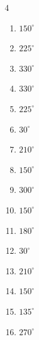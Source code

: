 \begin{multicols}{4}
\begin{enumerate}
  \item $\displaystyle 150^{\circ}$

  \item $\displaystyle 225^{\circ}$

  \item $\displaystyle 330^{\circ}$

  \item $\displaystyle 330^{\circ}$

  \item $\displaystyle 225^{\circ}$

  \item $\displaystyle 30^{\circ}$

  \item $\displaystyle 210^{\circ}$

  \item $\displaystyle 150^{\circ}$

\columnbreak %

  \item $\displaystyle 300^{\circ}$

  \item $\displaystyle 150^{\circ}$

  \item $\displaystyle 180^{\circ}$
        \phantom{$\displaystyle =\pi$}

  \item $\displaystyle 30^{\circ}$

  \item $\displaystyle 210^{\circ}$

  \item $\displaystyle 150^{\circ}$

  \item $\displaystyle 135^{\circ}$

  \item $\displaystyle 270^{\circ}$


\end{enumerate}
\end{multicols}
